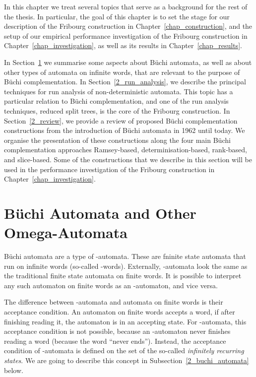 In this chapter we treat several topics that serve as a background for the rest of the thesis. In particular, the goal of this chapter is to set the stage for our description of the Fribourg construction in Chapter~\ref{chap_construction}, and the setup of our empirical performance investigation of the Fribourg construction in Chapter~\ref{chap_investigation}, as well as its results in Chapter~\ref{chap_results}.

In Section~\ref{2_automata} we summarise some aspects about Büchi automata, as well as about other types of automata on infinite words, that are relevant to the purpose of Büchi complementation. In Section~\ref{2_run_analysis}, we describe the principal techniques for run analysis of non-deterministic automata. This topic has a particular relation to Büchi complementation, and one of the run analysis techniques, reduced split trees, is the core of the Fribourg construction. In Section~\ref{2_review}, we provide a review of proposed Büchi complementation constructions from the introduction of Büchi automata in 1962 until today. We organise the presentation of these constructions along the four main Büchi complementation approaches Ramsey-based, determinisation-based, rank-based, and slice-based. Some of the constructions that we describe in this section will be used in the performance investigation of the Fribourg construction in Chapter~\ref{chap_investigation}.

\section{Büchi Automata and Other Omega-Automata}
\label{2_automata}
Büchi automata are a type of \om-automata. These are fninite state automata that run on infinite words (so-called \om-words). Externally, \om-automata look the same as the traditional finite state automata on finite words. It is possible to interpret any such automaton on finite words as an \om-automaton, and vice versa.

The difference between \om-automata and automata on finite words is their acceptance condition. An automaton on finite words accepts a word, if after finishing reading it, the automaton is in an accepting state. For \om-automata, this acceptance condition is not possible, because an \om-automaton never finishes reading a word (because the word ``never ends''). Instead, the acceptance condition of \om-automata is defined on the set of the so-called \textit{infinitely recurring states}. We are going to describe this concept in Subsection~\ref{2_buchi_automata} below. 

